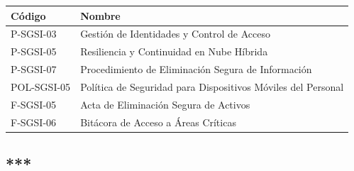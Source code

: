 \documentclass[10pt,letterpaper]{article}
\begin{document}
{\setlength{\RaggedRightRightskip}{0pt plus 5em}\small\sloppy \begin{longtable}[]{@{}
  >{\hspace{0pt}\RaggedRight\arraybackslash}p{}
  >{\hspace{0pt}\RaggedRight\arraybackslash}p{}@{}}
\toprule\noalign{}
\begin{minipage}[b]{\linewidth}\raggedright
Código
\end{minipage} & \begin{minipage}[b]{\linewidth}\raggedright
Nombre
\end{minipage} \\
\midrule\noalign{}
\endhead
\bottomrule\noalign{}
\endlastfoot
P-SGSI-03 & Gestión de Identidades y Control de Acceso \\
P-SGSI-05 & Resiliencia y Continuidad en Nube Híbrida \\
P-SGSI-07 & Procedimiento de Eliminación Segura de Información \\
POL-SGSI-05 & Política de Seguridad para Dispositivos Móviles del
Personal \\
F-SGSI-05 & Acta de Eliminación Segura de Activos \\
F-SGSI-06 & Bitácora de Acceso a Áreas Críticas \\
\end{longtable}\normalsize}

\subsection{***}\label{section}
\end{document}
